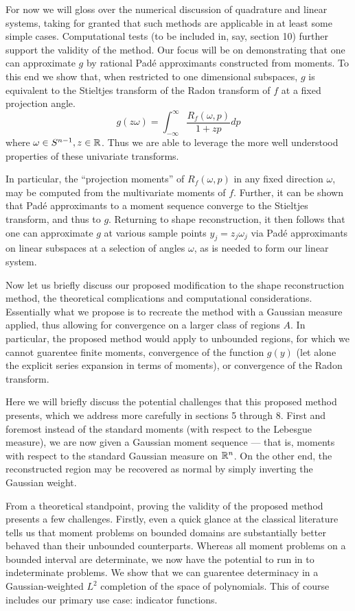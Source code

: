 For now we will gloss over the numerical discussion of quadrature and linear systems, taking for granted that such methods are applicable in at least some simple cases. Computational tests (to be included in, say, section 10) further support the validity of the method. Our focus will be on demonstrating that one can approximate $g$ by rational Pad\'e approximants constructed from moments. To this end we show that, when restricted to one dimensional subspaces, $g$ is equivalent to the Stieltjes transform of the Radon transform of $f$ at a fixed projection angle. 
\[
    g(z\omega) = \int_{-\infty}^\infty \frac{R_f(\omega,p)}{1 + zp}dp
\]
where $\omega \in S^{n-1}, z\in \mathbb{R}$. Thus we are able to leverage the more well understood properties of these univariate transforms. 

In particular, the ``projection moments'' of $R_f(\omega, p)$ in any fixed direction $\omega$, may be computed from the multivariate moments of $f$. Further, it can be shown that Pad\'e approximants to a moment sequence converge to the Stieltjes transform, and thus to $g$. Returning to shape reconstruction, it then follows that one can approximate $g$ at various sample points $y_j = z_j\omega_j$ via Pad\'e approximants on linear subspaces at a selection of angles $\omega$, as is needed to form our linear system.

Now let us briefly discuss our proposed modification to the shape reconstruction method, the theoretical complications and computational considerations. Essentially what we propose is to recreate the method with a Gaussian measure applied, thus allowing for convergence on a larger class of regions $A$. In particular, the proposed method would apply to unbounded regions, for which we cannot guarentee finite moments, convergence of the function $g(y)$ (let alone the explicit series expansion in terms of moments), or convergence of the Radon transform.

Here we will briefly discuss the potential challenges that this proposed method presents, which we address more carefully in sections 5 through 8. First and foremost instead of the standard moments (with respect to the Lebesgue measure), we are now given a Gaussian moment sequence — that is, moments with respect to the standard Gaussian measure on $\mathbb{R}^n$. On the other end, the reconstructed region may be recovered as normal by simply inverting the Gaussian weight. 

From a theoretical standpoint, proving the validity of the proposed method presents a few challenges. Firstly, even a quick glance at the classical literature tells us that moment problems on bounded domains are substantially better behaved than their unbounded counterparts. Whereas all moment problems on a bounded interval are determinate, we now have the potential to run in to indeterminate problems. We show that we can guarentee determinacy in a Gaussian-weighted $L^2$ completion of the space of polynomials. This of course includes our primary use case: indicator functions. 

